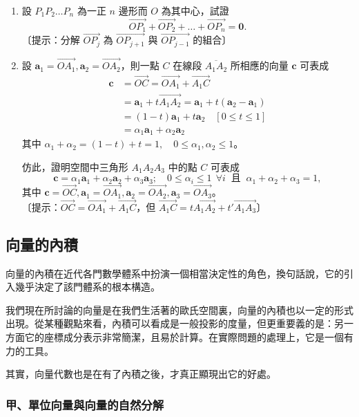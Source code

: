 \begin{enumerate}[label=\arabic*., leftmargin=2em]
  \item 設 $P_1 P_2 \dots P_n$ 為一正 $n$ 邊形而 $O$ 為其中心，試證
  \[ \vec{OP_1} + \vec{OP_2} + \dots + \vec{OP_n} = \mathbf{0}. \]
  〔提示：分解 $\vec{OP_j}$ 為 $\vec{OP_{j+1}}$ 與 $\vec{OP_{j-1}}$ 的組合〕
  \item 設 $\mathbf{a}_1 = \vec{OA_1}, \mathbf{a}_2 = \vec{OA_2}$，則一點 $C$ 在線段 $\overline{A_1 A_2}$ 所相應的向量 $\mathbf{c}$ 可表成
  \begin{align*}
  \mathbf{c} &= \vec{OC} = \vec{OA_1} + \vec{A_1 C} \\
  &= \mathbf{a}_1 + t\vec{A_1 A_2} = \mathbf{a}_1 + t(\mathbf{a}_2 - \mathbf{a}_1) \\
  &= (1 - t)\mathbf{a}_1 + t\mathbf{a}_2 \quad [0 \le t \le 1] \\
  &= \alpha_1\mathbf{a}_1 + \alpha_2\mathbf{a}_2
  \end{align*}
  其中 $\alpha_1 + \alpha_2 = (1 - t) + t = 1, \quad 0 \le \alpha_1, \alpha_2 \le 1$。

  仿此，證明空間中三角形 $A_1 A_2 A_3$ 中的點 $C$ 可表成
  \[ \mathbf{c} = \alpha_1\mathbf{a}_1 + \alpha_2\mathbf{a}_2 + \alpha_3\mathbf{a}_3; \quad 0 \le \alpha_i \le 1 \ \ \forall i \ \text{ 且 } \ \alpha_1 + \alpha_2 + \alpha_3 = 1, \]
  其中 $\mathbf{c} = \vec{OC}, \mathbf{a}_1 = \vec{OA_1}, \mathbf{a}_2 = \vec{OA_2}, \mathbf{a}_3 = \vec{OA_3}$。\\
  〔提示：$\vec{OC} = \vec{OA_1} + \vec{A_1 C}$，但 $\vec{A_1 C} = t\vec{A_1 A_2} + t'\vec{A_1 A_3}$〕
\end{enumerate}

\subsection{向量的內積}
\label{sec:b3-3-5}

向量的內積在近代各門數學體系中扮演一個相當決定性的角色，換句話說，它的引入幾乎決定了該門體系的根本構造。

我們現在所討論的向量是在我們生活著的歐氏空間裏，向量的內積也以一定的形式出現。從某種觀點來看，內積可以看成是一般投影的度量，但更重要義的是：另一方面它的座標成分表示非常簡潔，且易於計算。在實際問題的處理上，它是一個有力的工具。

其實，向量代數也是在有了內積之後，才真正顯現出它的好處。

\subsubsection*{甲、單位向量與向量的自然分解}

